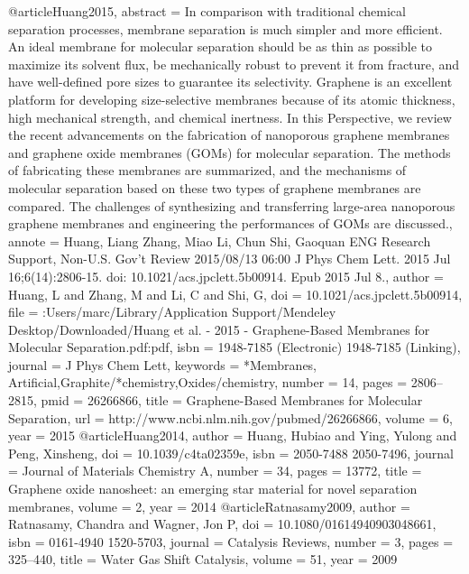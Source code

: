 @article{Huang2015,
abstract = {In comparison with traditional chemical separation processes, membrane separation is much simpler and more efficient. An ideal membrane for molecular separation should be as thin as possible to maximize its solvent flux, be mechanically robust to prevent it from fracture, and have well-defined pore sizes to guarantee its selectivity. Graphene is an excellent platform for developing size-selective membranes because of its atomic thickness, high mechanical strength, and chemical inertness. In this Perspective, we review the recent advancements on the fabrication of nanoporous graphene membranes and graphene oxide membranes (GOMs) for molecular separation. The methods of fabricating these membranes are summarized, and the mechanisms of molecular separation based on these two types of graphene membranes are compared. The challenges of synthesizing and transferring large-area nanoporous graphene membranes and engineering the performances of GOMs are discussed.},
annote = {Huang, Liang
Zhang, Miao
Li, Chun
Shi, Gaoquan
ENG
Research Support, Non-U.S. Gov't
Review
2015/08/13 06:00
J Phys Chem Lett. 2015 Jul 16;6(14):2806-15. doi: 10.1021/acs.jpclett.5b00914. Epub 2015 Jul 8.},
author = {Huang, L and Zhang, M and Li, C and Shi, G},
doi = {10.1021/acs.jpclett.5b00914},
file = {:Users/marc/Library/Application Support/Mendeley Desktop/Downloaded/Huang et al. - 2015 - Graphene-Based Membranes for Molecular Separation.pdf:pdf},
isbn = {1948-7185 (Electronic)
1948-7185 (Linking)},
journal = {J Phys Chem Lett},
keywords = {*Membranes, Artificial,Graphite/*chemistry,Oxides/chemistry},
number = {14},
pages = {2806--2815},
pmid = {26266866},
title = {{Graphene-Based Membranes for Molecular Separation}},
url = {http://www.ncbi.nlm.nih.gov/pubmed/26266866},
volume = {6},
year = {2015}
}
@article{Huang2014,
author = {Huang, Hubiao and Ying, Yulong and Peng, Xinsheng},
doi = {10.1039/c4ta02359e},
isbn = {2050-7488
2050-7496},
journal = {Journal of Materials Chemistry A},
number = {34},
pages = {13772},
title = {{Graphene oxide nanosheet: an emerging star material for novel separation membranes}},
volume = {2},
year = {2014}
}
@article{Ratnasamy2009,
author = {Ratnasamy, Chandra and Wagner, Jon P},
doi = {10.1080/01614940903048661},
isbn = {0161-4940
1520-5703},
journal = {Catalysis Reviews},
number = {3},
pages = {325--440},
title = {{Water Gas Shift Catalysis}},
volume = {51},
year = {2009}
}
